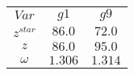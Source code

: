 \begin{tabular}{ccc}
$Var$ & $g1$ & $g9$\\
$z^{star}$ & $86.0$ & $72.0$\\
$z$ & $86.0$ & $95.0$\\
$\omega$ & $1.306$ & $1.314$\\
\end{tabular}
